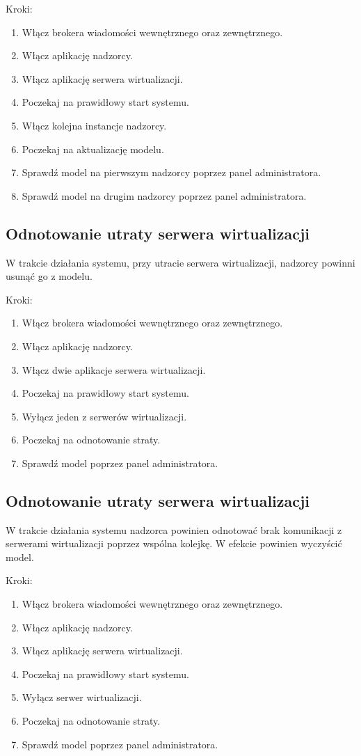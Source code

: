 \documentclass[12pt]{article}
\begin{document}
Kroki:
\begin{enumerate}
	\item Włącz brokera wiadomości wewnętrznego oraz zewnętrznego.
	\item Włącz aplikację nadzorcy.
	\item Włącz aplikację serwera wirtualizacji.
	\item Poczekaj na prawidłowy start systemu.
	\item Włącz kolejna instancje nadzorcy.
	\item Poczekaj na aktualizację modelu.
	\item Sprawdź model na pierwszym nadzorcy poprzez panel administratora.
	\item Sprawdź model na drugim nadzorcy poprzez panel administratora.
\end{enumerate}

\subsection {Odnotowanie utraty serwera wirtualizacji}
W trakcie działania systemu, przy utracie serwera wirtualizacji, nadzorcy powinni usunąć go z modelu.

Kroki:
\begin{enumerate}
	\item Włącz brokera wiadomości wewnętrznego oraz zewnętrznego.
	\item Włącz aplikację nadzorcy.
	\item Włącz dwie aplikacje serwera wirtualizacji.
	\item Poczekaj na prawidłowy start systemu.
	\item Wyłącz jeden z serwerów wirtualizacji.
	\item Poczekaj na odnotowanie straty.
	\item Sprawdź model poprzez panel administratora.
\end{enumerate}

\subsection {Odnotowanie utraty serwera wirtualizacji}
W trakcie działania systemu nadzorca powinien odnotować brak komunikacji z serwerami wirtualizacji poprzez wspólna kolejkę.
W efekcie powinien wyczyścić model.

Kroki:
\begin{enumerate}
	\item Włącz brokera wiadomości wewnętrznego oraz zewnętrznego.
	\item Włącz aplikację nadzorcy.
	\item Włącz aplikację serwera wirtualizacji.
	\item Poczekaj na prawidłowy start systemu.
	\item Wyłącz serwer wirtualizacji.
	\item Poczekaj na odnotowanie straty.
	\item Sprawdź model poprzez panel administratora.
\end{enumerate}
\end{document}
